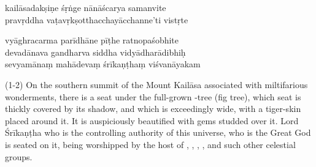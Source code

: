 \documentclass{xminimal}
\title{\relax}
\author{\relax}
\date{\relax}
\begin{document}

\thispagestyle{empty}

\begin{sloka}

\end{sloka}

\begin{sloka}
  kailāsadakṣiṇe śṛṅge nānāścarya samanvite \danda\\
  pravṛddha vaṭavṛkṣotthacchayācchanne'ti vistṛte  \ddanda

  vyāghracarma parīdhāne pīṭhe ratnopaśobhite \danda\\
  devadānava gandharva siddha vidyādharādibhiḥ  \ddanda\\
  sevyamānaṃ mahādevaṃ śrīkaṇṭhaṃ viśvanāyakam \danda
\end{sloka}

(1-2) On the southern summit of the Mount Kailāsa associated with miltifarious
wonderments, there is a seat under the full-grown -tree (fig tree),
which seat is thickly covered by its shadow, and which is exceedingly wide, with
a tiger-skin placed around it. It is auspiciously beautified with gems studded
over it. Lord Śrīkaṇṭha who is the controlling authority of this universe,
who is the Great God is seated on it, being worshipped by the host of ,
, , ,  and such other
celestial groups.
\end{document}
